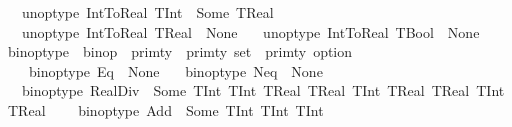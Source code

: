 \begin{isabellebody}
\ \ {\isacharbar}{\kern0pt}\ {\isachardoublequoteopen}unop{\isacharunderscore}{\kern0pt}type\ IntToReal\ TInt\ {\isacharequal}{\kern0pt}\ Some\ TReal{\isachardoublequoteclose}\isanewline
\ \ {\isacharbar}{\kern0pt}\ {\isachardoublequoteopen}unop{\isacharunderscore}{\kern0pt}type\ IntToReal\ TReal\ {\isacharequal}{\kern0pt}\ None{\isachardoublequoteclose}\isanewline
\ \ {\isacharbar}{\kern0pt}\ {\isachardoublequoteopen}unop{\isacharunderscore}{\kern0pt}type\ IntToReal\ TBool\ {\isacharequal}{\kern0pt}\ None{\isachardoublequoteclose}\isanewline
\isanewline
{}\isamarkupfalse%
\ binop{\isacharunderscore}{\kern0pt}type\ {\isacharcolon}{\kern0pt}{\isacharcolon}{\kern0pt}\ {\isachardoublequoteopen}binop\ {\isasymRightarrow}\ {\isacharparenleft}{\kern0pt}{\isacharparenleft}{\kern0pt}prim{\isacharunderscore}{\kern0pt}ty\ {\isasymtimes}\ prim{\isacharunderscore}{\kern0pt}ty{\isacharparenright}{\kern0pt}\ set\ {\isasymtimes}\ prim{\isacharunderscore}{\kern0pt}ty{\isacharparenright}{\kern0pt}\ option{\isachardoublequoteclose}\isanewline
\ \ \isanewline
\ \ \ \ {\isachardoublequoteopen}binop{\isacharunderscore}{\kern0pt}type\ Eq\ {\isacharequal}{\kern0pt}\ None{\isachardoublequoteclose}\isanewline
\ \ {\isacharbar}{\kern0pt}\ {\isachardoublequoteopen}binop{\isacharunderscore}{\kern0pt}type\ Neq\ {\isacharequal}{\kern0pt}\ None{\isachardoublequoteclose}\isanewline
\ \ {\isacharbar}{\kern0pt}\ {\isachardoublequoteopen}binop{\isacharunderscore}{\kern0pt}type\ RealDiv\ {\isacharequal}{\kern0pt}\ Some\ {\isacharparenleft}{\kern0pt}{\isacharbraceleft}{\kern0pt}{\isacharparenleft}{\kern0pt}TInt{\isacharcomma}{\kern0pt}\ TInt{\isacharparenright}{\kern0pt}{\isacharcomma}{\kern0pt}\ {\isacharparenleft}{\kern0pt}TReal{\isacharcomma}{\kern0pt}\ TReal{\isacharparenright}{\kern0pt}{\isacharcomma}{\kern0pt}\ {\isacharparenleft}{\kern0pt}TInt{\isacharcomma}{\kern0pt}\ TReal{\isacharparenright}{\kern0pt}{\isacharcomma}{\kern0pt}\ {\isacharparenleft}{\kern0pt}TReal{\isacharcomma}{\kern0pt}\ TInt{\isacharparenright}{\kern0pt}{\isacharbraceright}{\kern0pt}{\isacharcomma}{\kern0pt}\ TReal{\isacharparenright}{\kern0pt}{\isachardoublequoteclose}\ \isanewline
\ \ {\isacharbar}{\kern0pt}\ {\isachardoublequoteopen}binop{\isacharunderscore}{\kern0pt}type\ Add\ {\isacharequal}{\kern0pt}\ Some\ {\isacharparenleft}{\kern0pt}{\isacharbraceleft}{\kern0pt}{\isacharparenleft}{\kern0pt}TInt{\isacharcomma}{\kern0pt}\ TInt{\isacharparenright}{\kern0pt}{\isacharbraceright}{\kern0pt}{\isacharcomma}{\kern0pt}\ TInt{\isacharparenright}{\kern0pt}{\isachardoublequoteclose}\isanewline

\end{isabellebody}
